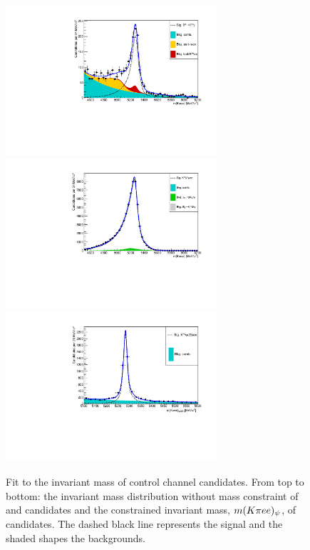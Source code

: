 \begin{figure}[h!]
\centering
\includegraphics[width=0.7\textwidth]{RKst/figs/Fit/fit_EE/fit_G.pdf}
\includegraphics[width=0.7\textwidth]{RKst/figs/Fit/fit_EE/fit_JPs_P.pdf}
\includegraphics[width=0.7\textwidth]{RKst/figs/Fit/fit_EE/fit_Psi.pdf}
\caption{Fit to the \mKpiee invariant mass of control channel candidates.
From top to bottom: the invariant mass distribution without mass constraint of \BdToKstGee
and \BdToKstJPsee candidates and the constrained invariant mass, $\mKpiee_{\psi}$, of \BdToKstPsiee candidates.
The dashed black line represents the signal and the shaded shapes the backgrounds.}
\label{fig:fitsControlEE}
\end{figure}

\clearpage

